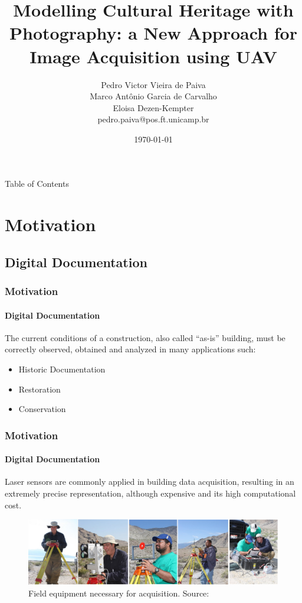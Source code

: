 \documentclass{beamer}
\title[Modelling Cultural Heritage with Photography]{
 Modelling Cultural Heritage with Photography: a New Approach for Image Acquisition using UAV}
\author[Pedro Victor Vieira de Paiva]{
  Pedro Victor Vieira de Paiva\\
  Marco Antônio Garcia de Carvalho\\
  Eloisa Dezen-Kempter\\\medskip
  {\small {pedro.paiva@pos.ft.unicamp.br}
  }}
\institute[]{
  }
\date{\today}
\begin{document}
\begin{frame}
  \titlepage
\end{frame}

\begin{frame}{Table of Contents}
    \begin{multicols}{2}
    \tableofcontents
    \end{multicols}
\end{frame}

\section{Motivation}
\subsection{Digital Documentation}
\begin{frame}
    \frametitle{Motivation}
    \framesubtitle{Digital Documentation}
    \justifying The current conditions of a construction, also called “as-is” building, must be correctly observed, obtained and analyzed in many applications \citep{remondino2011} such: 
    
    \begin{itemize}[<+-| alert@+>]
        \item Historic Documentation
        \item Restoration
        \item Conservation
    \end{itemize}
\end{frame}

\begin{frame}
    \frametitle{Motivation}
    \framesubtitle{Digital Documentation}
    \justifying Laser sensors are commonly applied in building data acquisition, resulting in an extremely precise representation, although expensive and its high computational cost.
    
    \begin{figure}
        \centering
        \includegraphics[scale=.16]{images/6}
        \caption{Field equipment necessary for acquisition. Source: \citep{oldow2008application}}
    \end{figure}
    
\end{frame}
\end{document}
